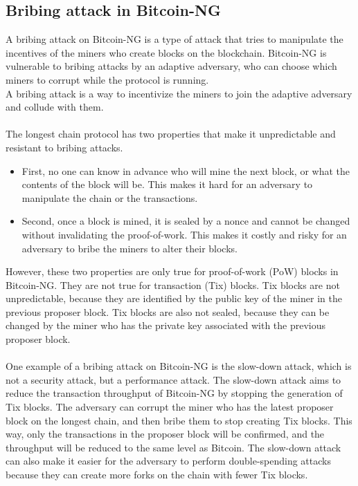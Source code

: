 \subsection{Bribing attack in Bitcoin-NG}
A bribing attack on Bitcoin-NG is a type of attack that tries to manipulate the incentives of the miners who create blocks on the blockchain.
 Bitcoin-NG is vulnerable to bribing attacks by an adaptive adversary, who can choose which miners to corrupt while the protocol is running.\\
A bribing attack is a way to incentivize the miners to join the adaptive adversary and collude with them.\\\\
The longest chain protocol has two properties that make it unpredictable and resistant to bribing attacks.
\begin{itemize}
    \item First, no one can know in advance who will mine the next block, or what the contents of the block will be. This makes it hard for an adversary to manipulate the chain or the transactions.
    \item Second, once a block is mined, it is sealed by a nonce and cannot be changed without invalidating the proof-of-work. This makes it costly and risky for an adversary to bribe the miners to alter their blocks.
\end{itemize} 
However, these two properties are only true for proof-of-work (PoW) blocks in Bitcoin-NG. They are not true for transaction (Tix) blocks. Tix blocks are not unpredictable, because they are identified by the public key of the miner in the previous proposer block. Tix blocks are also not sealed, because they can be changed by the miner who has the private key associated with the previous proposer block.\\\\
One example of a bribing attack on Bitcoin-NG is the slow-down attack, which is not a security attack, but a performance attack. The slow-down attack aims to reduce the transaction throughput of Bitcoin-NG by stopping the generation of Tix blocks. The adversary can corrupt the miner who has the latest proposer block on the longest chain, and then bribe them to stop creating Tix blocks. This way, only the transactions in the proposer block will be confirmed, and the throughput will be reduced to the same level as Bitcoin. The slow-down attack can also make it easier for the adversary to perform double-spending attacks because they can create more forks on the chain with fewer Tix blocks.

